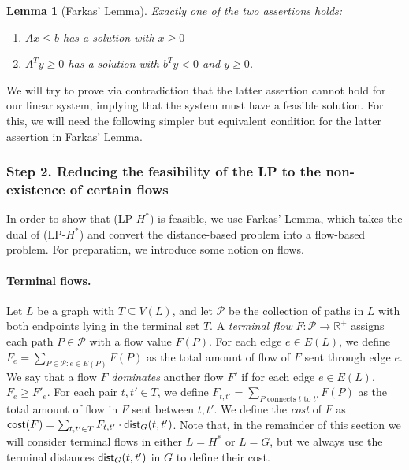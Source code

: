 \documentclass[11pt]{article}
\newtheorem{lemma}[theorem]{Lemma}
\newcommand{\dist}{\textnormal{\textsf{dist}}}
\begin{document}
\begin{lemma}[Farkas' Lemma]
Exactly one of the two assertions holds:
\begin{enumerate}[label=\alph*.]
    \item $Ax\le b$ has a solution with $x\ge 0$
    \item $A^Ty\ge 0$ has a solution with $b^Ty<0$ and $y\ge 0$.
\end{enumerate}\label{lem:farkas}
\end{lemma}

We will try to prove via contradiction that the latter assertion cannot hold for our linear system, implying that the system must have a feasible solution. For this, we will need the following simpler but equivalent condition for the latter assertion in Farkas' Lemma. 
\fi


\subsubsection*{Step 2. Reducing the feasibility of the LP to the non-existence of certain flows}

In order to show that (LP-$H^*$) is feasible, we use Farkas' Lemma, which takes the dual of (LP-$H^*$) and convert the distance-based problem into a flow-based problem.
For preparation, we introduce some notion on flows.

\newcommand{\pset}{{\mathscr{P}}}
\newcommand{\cost}{\mathsf{cost}}

\paragraph{Terminal flows.} 
Let $L$ be a graph with $T\subseteq V(L)$, and let $\mathcal{P}$ be the collection of paths in $L$ with both endpoints lying in the terminal set $T$. A \emph{terminal flow} $F: \mathcal{P}\to \mathbb{R}^+$ assigns each path $P\in\mathcal{P}$ with a flow value $F(P)$. 
For each edge $e\in E(L)$, we define $F_e=\sum_{P\in \mathcal{P}: e\in E(P)}F(P)$ as the total amount of flow of $F$ sent through edge $e$. We say that a flow $F$ \emph{dominates} another flow $F'$ if for each edge $e\in E(L)$, $F_e\ge F'_e$. 
For each pair $t,t'\in T$, we define $F_{t,t'}=\sum_{P \text{ connects } t\text{ to }t'}F(P)$ as the total amount of flow in $F$ sent between $t,t'$. 
We define the \emph{cost} of $F$ as $\cost(F)=\sum_{t,t'\in T}F_{t,t'}\cdot \dist_G(t,t')$.
Note that, in the remainder of this section we will consider terminal flows in either $L=H^*$ or $L=G$, but we always use the terminal distances $\dist_G(t,t')$ in $G$ to define their cost.
\end{document}
